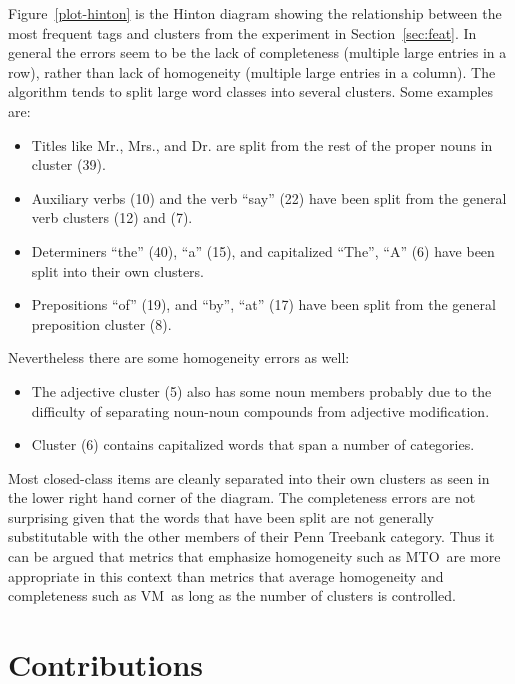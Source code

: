 \documentclass[11pt]{article}
\newcommand{\mto}{\mbox{MTO }}
\newcommand{\vm}{\mbox{VM }}
\begin{document}
Figure~\ref{plot-hinton} is the Hinton diagram showing the
relationship between the most frequent tags and clusters from the
experiment in Section~\ref{sec:feat}.  In general the errors seem to
be the lack of completeness (multiple large entries in a row), rather
than lack of homogeneity (multiple large entries in a column).  The
algorithm tends to split large word classes into several clusters.
Some examples are:
\begin{itemize}
\item Titles like Mr., Mrs., and Dr. are split from the rest of the
  proper nouns in cluster (39).
\item Auxiliary verbs (10) and the verb ``say'' (22) have been split
  from the general verb clusters (12) and (7).
\item Determiners ``the'' (40), ``a'' (15), and capitalized
  ``The'', ``A'' (6) have been split into their own clusters.
\item Prepositions ``of'' (19), and ``by'', ``at'' (17) have been
  split from the general preposition cluster (8).
\end{itemize}
Nevertheless there are some homogeneity errors as well:
\begin{itemize} 
\item The adjective cluster (5) also has some noun members probably
  due to the difficulty of separating noun-noun compounds from
  adjective modification.
\item Cluster (6) contains capitalized words that span a number of
  categories.
\end{itemize}

Most closed-class items are cleanly separated into their own clusters
as seen in the lower right hand corner of the diagram.  The
completeness errors are not surprising given that the words that have
been split are not generally substitutable with the other members of
their Penn Treebank category.  Thus it can be argued that metrics that
emphasize homogeneity such as \mto are more appropriate in this
context than metrics that average homogeneity and completeness such as
\vm as long as the number of clusters is controlled.

\section{Contributions}
\label{sec:contrib}
\end{document}
